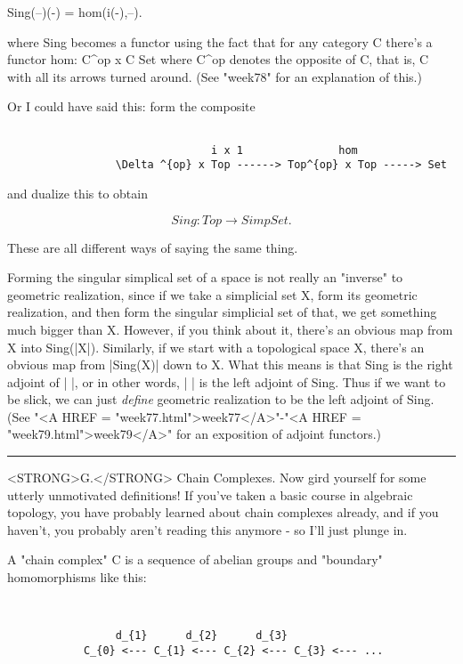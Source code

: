                  Sing(--)(-) = hom(i(-),--).

where Sing becomes a functor using the fact that for any category C
there's a functor 
hom: C^{op} x C \to  Set
where C^{op} denotes the opposite of C, that is, C
with all its arrows turned around.  (See
"week78" for an explanation of this.)

Or I could have said this: form the composite


\begin{verbatim}

                                i x 1               hom
                 \Delta ^{op} x Top ------> Top^{op} x Top -----> Set

\end{verbatim}
    
and dualize this to obtain

$$

                 Sing: Top \to  SimpSet.
$$
    
These are all different ways of saying the same thing.   

Forming the singular simplical set of a space is not really 
an "inverse"
to geometric realization, since if we take a simplicial set X, form its
geometric realization, and then form the singular simplicial set of
that, we get something much bigger than X.  However, if you think about
it, there's an obvious map from X into Sing(|X|).  Similarly, if we
start with a topological space X, there's an obvious map from |Sing(X)|
down to X.  
What this means is that Sing is the right adjoint of | |, or in other
words, | | is the left adjoint of Sing.  Thus if we want to be slick,
we can just \emph{define} geometric realization to be the left adjoint of
Sing. (See "<A HREF = "week77.html">week77</A>"-"<A HREF = "week79.html">week79</A>" for an exposition of adjoint functors.)

\par\noindent\rule{\textwidth}{0.4pt}
<STRONG>G.</STRONG>  Chain Complexes.  Now gird yourself for some utterly unmotivated
definitions!  If you've taken a basic course in algebraic topology, you
have probably learned about chain complexes already, and if you haven't,
you probably aren't reading this anymore - so I'll just plunge in.


 A "chain complex" C is a sequence of abelian groups and
"boundary" homomorphisms like this:

\begin{verbatim}


                 d_{1}      d_{2}      d_{3}
            C_{0} <--- C_{1} <--- C_{2} <--- C_{3} <--- ...
\end{verbatim}
    
